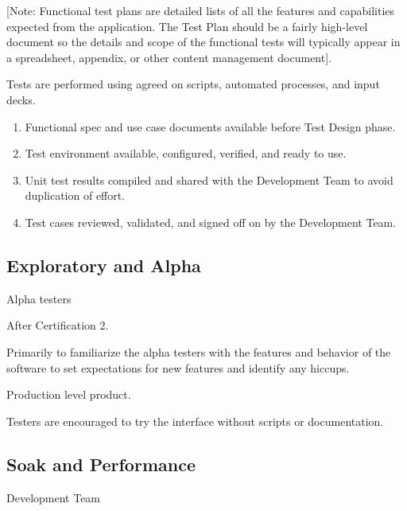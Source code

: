 \documentclass[letterpaper,10pt,english]{sphinxmanual}
\begin{document}
 {[}Note: Functional test plans are detailed lists of all the features and capabilities expected from the application.  The Test Plan should be a fairly high-level document so the details and scope of the functional tests will typically appear in a spreadsheet, appendix, or other content management document{]}.

 Tests are performed using agreed on scripts, automated processes, and input decks.

\begin{enumerate}
\def\theenumi{\arabic{enumi}}
\def\labelenumi{\theenumi .}
\makeatletter\def\p@enumii{\p@enumi \theenumi .}\makeatother
\item {} 
Functional spec and use case documents available before Test Design phase.

\item {} 
Test environment available, configured, verified, and ready to use.

\item {} 
Unit test results compiled and shared with the Development Team to avoid duplication of effort.

\item {} 
Test cases reviewed, validated, and signed off on by the Development Team.

\end{enumerate}


\subsection{Exploratory and Alpha}
\label{\detokenize{test_plan/strategy:exploratory-and-alpha}}
 Alpha testers

 After Certification 2.

 Primarily to familiarize the alpha testers with the features and behavior of the software to set expectations for new features and identify any hiccups.

 Production level product.

 Testers are encouraged to try the interface without scripts or documentation.


\subsection{Soak and Performance}
\label{\detokenize{test_plan/strategy:soak-and-performance}}
 Development Team
\end{document}
